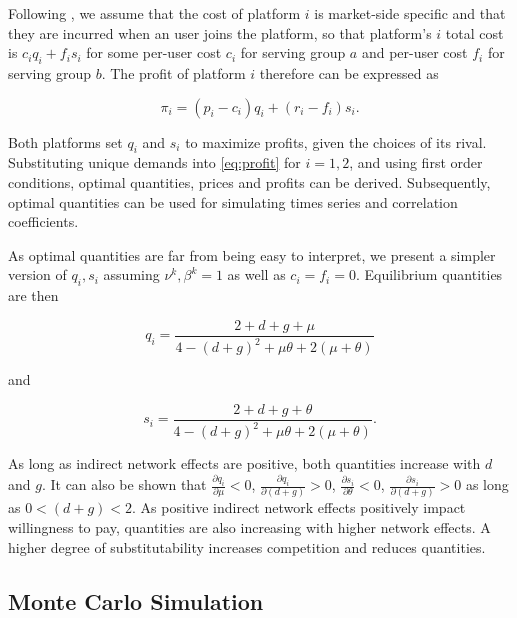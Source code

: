 \documentclass[12pt,a4paper,notitlepage]{article}
\begin{document}
Following \cite{armstrong_competition_2006}, we assume that the cost of platform $i$ is market-side specific and that they are incurred when an user joins the platform, so that platform's $i$ total cost is $c_i q_i+f_i s_i$ for some per-user cost $c_i$ for serving group $a$ and per-user cost $f_i$ for serving group $b$. The profit of platform $i$ therefore can be expressed as 

\begin{equation}\label{eq:profit}
\pi_i=(p_i-c_i)q_i+(r_i-f_i)s_i.
\end{equation}

Both platforms set $q_i$ and $s_i$ to maximize profits, given the choices of its rival. Substituting unique demands into \ref{eq:profit} for $i=1,2$, and using first order conditions, optimal quantities, prices and profits can be derived. Subsequently, optimal quantities can be used for simulating times series and correlation coefficients.

As optimal quantities are far from being easy to interpret, we present a simpler version of $q_i, s_i$ assuming $\nu^k, \beta^k=1$  as well as $c_i=f_i=0$. Equilibrium quantities are then

\begin{equation}\label{eq_quantities1}
	q_i=\frac{2+d+g+\mu}{4-(d+g)^2+\mu\theta+2(\mu+\theta)}
\end{equation}

and

\begin{equation}\label{eq_quantities2}
	s_i=\frac{2+d+g+\theta}{4-(d+g)^2+\mu\theta+2(\mu+\theta)}.
\end{equation}

As long as indirect network effects are positive, both quantities increase with $d$ and $g$. It can also be shown that $\frac{\partial q_i}{\partial \mu}<0$, $\frac{\partial q_i}{\partial (d+g)}>0$, $\frac{\partial s_i}{\partial \theta}<0$, $\frac{\partial s_i}{\partial (d+g)}>0$ as long as $0<(d+g)<2$. As positive indirect network effects positively impact willingness to pay, quantities are also increasing with higher network effects. A higher degree of substitutability increases competition and reduces quantities.  


\subsection{Monte Carlo Simulation}
\end{document}
